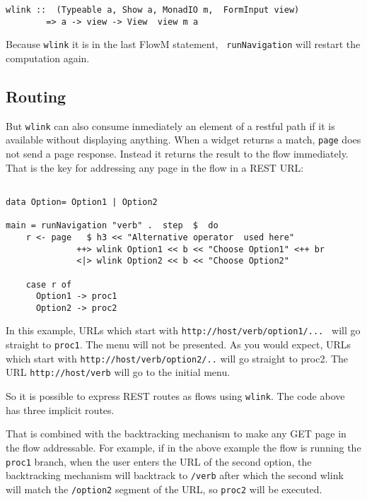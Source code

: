 \documentclass{tmr}
\begin{document}
{\tt 
 
\begin{verbatim} 
wlink ::  (Typeable a, Show a, MonadIO m,  FormInput view) 
        => a -> view -> View  view m a 
\end{verbatim} 
 
} 
Because {\tt wlink} it is in the last FlowM statement, {\tt 
runNavigation} will restart the computation again. 
 
\subsection{Routing} 
But {\tt wlink} can also consume inmediately an element of a restful path if it is available without displaying anything. When a widget returns a match, {\tt page} does not send a page response. Instead it returns the result to the flow immediately. That is the key for addressing any page in the flow in a REST URL: 
 
{\tt 
 
\begin{verbatim} 
 
data Option= Option1 | Option2 
 
main = runNavigation "verb" .  step  $  do 
    r <- page   $ h3 << "Alternative operator  used here" 
              ++> wlink Option1 << b << "Choose Option1" <++ br 
              <|> wlink Option2 << b << "Choose Option2" 
 
    case r of 
      Option1 -> proc1 
      Option2 -> proc2 
\end{verbatim} 
 
} 
 
In this example, URLs which start with {\tt http://host/verb/option1/... } will go straight to {\tt proc1}.  The menu will not be presented.  As you would expect, URLs which start with {\tt http://host/verb/option2/..} will go straight to proc2.  The URL {\tt http://host/verb} will go to the initial menu. 
 
So it is possible to express REST routes as flows using {\tt wlink}. The code above has three implicit routes. 
 
That is combined with the backtracking mechanism to make any GET page in the flow addressable. For example, if in the above example the flow is running the {\tt proc1} branch, when the user enters the URL of the second option, the backtracking mechanism will backtrack to {\tt /verb} after which the second wlink will match the {\tt /option2} segment of the URL, so {\tt proc2} will be executed. 
 
\end{document}

